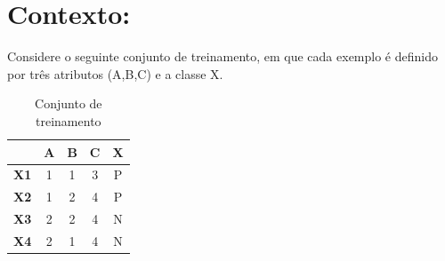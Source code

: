 \documentclass[
    article,            %
    11pt,               %
    oneside,            %
    a4paper,            %
    english,            %
    brazil,             %
    sumario=tradicional,
    ]{abntex2}
\begin{document}

\frenchspacing 


%
%

\maketitle


\textual


\section*{\textbf{Contexto:}}

Considere o seguinte conjunto de treinamento, em que cada exemplo é definido por três atributos (A,B,C) e a classe X.

\begin{table}[H]
\centering
\caption{Conjunto de treinamento}
\label{train_table}
\begin{tabular}{|c|c|c|c|c|}
\hline
\rowcolor[HTML]{34CDF9} 
            & \textbf{A} & \textbf{B} & \textbf{C} & \textbf{X} \\ \hline
\textbf{X1} & 1          & 1          & 3          & P          \\ \hline
\textbf{X2} & 1          & 2          & 4          & P          \\ \hline
\textbf{X3} & 2          & 2          & 4          & N          \\ \hline
\textbf{X4} & 2          & 1          & 4          & N          \\ \hline
\end{tabular}
\end{table}
\end{document}
